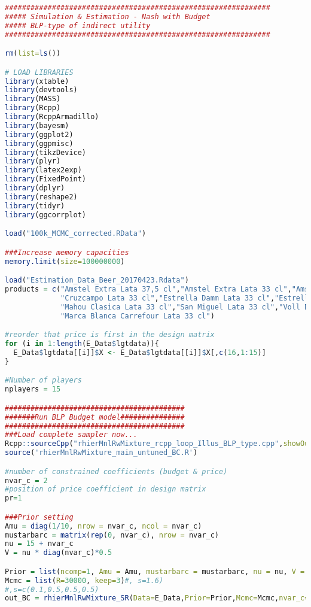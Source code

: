 \begin{lstlisting}[language=R,caption={Estimation of the hierarchical Bayesian MNL model and MCMC sampling routine}, label=lst_betas]
##############################################################
##### Simulation & Estimation - Nash with Budget
##### BLP-type of indirect utility
##############################################################

rm(list=ls())

# LOAD LIBRARIES
library(xtable)
library(devtools)
library(MASS)
library(Rcpp)
library(RcppArmadillo)
library(bayesm)
library(ggplot2)
library(ggpmisc)
library(tikzDevice)
library(plyr)
library(latex2exp)
library(FixedPoint)
library(dplyr)
library(reshape2)
library(tidyr)
library(ggcorrplot)

load("100k_MCMC_corrected.RData")

###Increase memory capacities
memory.limit(size=100000000)

load("Estimation_Data_Beer_20170423.Rdata")
products = c("Amstel Extra Lata 37,5 cl","Amstel Extra Lata 33 cl","Amstel Lata 37,5 cl","Amstel Lata 33 cl","Amstel Clasica Lata 33 cl",
             "Cruzcampo Lata 33 cl","Estrella Damm Lata 33 cl","Estrella Galicia Lata 33 cl","Heineken Lata 33 cl","Mahou 5 Estrellas Lata 33 cl",
             "Mahou Clasica Lata 33 cl","San Miguel Lata 33 cl","Voll Damm Lata 33 cl","Steinburg (Marca Blanca Mercadona) Lata 33 cl",
             "Marca Blanca Carrefour Lata 33 cl")

#reorder that price is first in the design matrix
for (i in 1:length(E_Data$lgtdata)){
  E_Data$lgtdata[[i]]$X <- E_Data$lgtdata[[i]]$X[,c(16,1:15)]
}

#Number of players
nplayers = 15

##########################################
#######Run BLP Budget model###############
##########################################
###Load complete sampler now...
Rcpp::sourceCpp("rhierMnlRwMixture_rcpp_loop_Illus_BLP_type.cpp",showOutput = FALSE)
source('rhierMnlRwMixture_main_untuned_BC.R')

#number of constrained coefficients (budget & price)
nvar_c = 2
#position of price coefficient in design matrix
pr=1

###Prior setting
Amu = diag(1/10, nrow = nvar_c, ncol = nvar_c)
mustarbarc = matrix(rep(0, nvar_c), nrow = nvar_c)
nu = 15 + nvar_c
V = nu * diag(nvar_c)*0.5

Prior = list(ncomp=1, Amu = Amu, mustarbarc = mustarbarc, nu = nu, V = V)
Mcmc = list(R=30000, keep=3)#, s=1.6)
#,s=c(0.1,0.5,0.5,0.5)
out_BC = rhierMnlRwMixture_SR(Data=E_Data,Prior=Prior,Mcmc=Mcmc,nvar_c=nvar_c,pr=pr,starting_budget = log(0.74))


\end{lstlisting}
